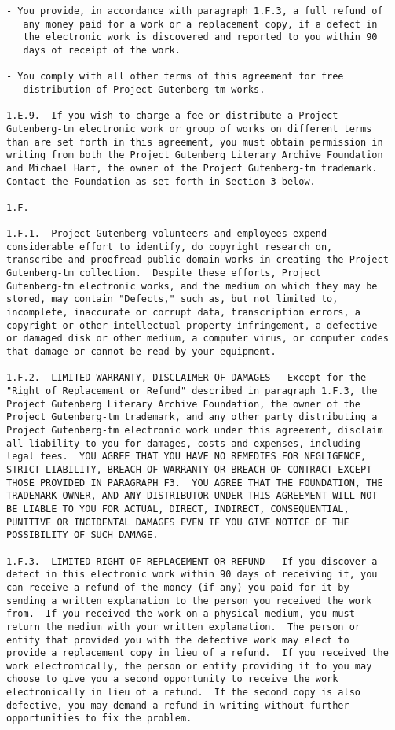 \documentclass[letterpaper,12pt,oneside,openany]{memoir}
\begin{document}
\begin{verbatim}
- You provide, in accordance with paragraph 1.F.3, a full refund of
   any money paid for a work or a replacement copy, if a defect in
   the electronic work is discovered and reported to you within 90
   days of receipt of the work.

- You comply with all other terms of this agreement for free
   distribution of Project Gutenberg-tm works.

1.E.9.  If you wish to charge a fee or distribute a Project
Gutenberg-tm electronic work or group of works on different terms
than are set forth in this agreement, you must obtain permission in
writing from both the Project Gutenberg Literary Archive Foundation
and Michael Hart, the owner of the Project Gutenberg-tm trademark.
Contact the Foundation as set forth in Section 3 below.

1.F.

1.F.1.  Project Gutenberg volunteers and employees expend
considerable effort to identify, do copyright research on,
transcribe and proofread public domain works in creating the Project
Gutenberg-tm collection.  Despite these efforts, Project
Gutenberg-tm electronic works, and the medium on which they may be
stored, may contain "Defects," such as, but not limited to,
incomplete, inaccurate or corrupt data, transcription errors, a
copyright or other intellectual property infringement, a defective
or damaged disk or other medium, a computer virus, or computer codes
that damage or cannot be read by your equipment.

1.F.2.  LIMITED WARRANTY, DISCLAIMER OF DAMAGES - Except for the
"Right of Replacement or Refund" described in paragraph 1.F.3, the
Project Gutenberg Literary Archive Foundation, the owner of the
Project Gutenberg-tm trademark, and any other party distributing a
Project Gutenberg-tm electronic work under this agreement, disclaim
all liability to you for damages, costs and expenses, including
legal fees.  YOU AGREE THAT YOU HAVE NO REMEDIES FOR NEGLIGENCE,
STRICT LIABILITY, BREACH OF WARRANTY OR BREACH OF CONTRACT EXCEPT
THOSE PROVIDED IN PARAGRAPH F3.  YOU AGREE THAT THE FOUNDATION, THE
TRADEMARK OWNER, AND ANY DISTRIBUTOR UNDER THIS AGREEMENT WILL NOT
BE LIABLE TO YOU FOR ACTUAL, DIRECT, INDIRECT, CONSEQUENTIAL,
PUNITIVE OR INCIDENTAL DAMAGES EVEN IF YOU GIVE NOTICE OF THE
POSSIBILITY OF SUCH DAMAGE.

1.F.3.  LIMITED RIGHT OF REPLACEMENT OR REFUND - If you discover a
defect in this electronic work within 90 days of receiving it, you
can receive a refund of the money (if any) you paid for it by
sending a written explanation to the person you received the work
from.  If you received the work on a physical medium, you must
return the medium with your written explanation.  The person or
entity that provided you with the defective work may elect to
provide a replacement copy in lieu of a refund.  If you received the
work electronically, the person or entity providing it to you may
choose to give you a second opportunity to receive the work
electronically in lieu of a refund.  If the second copy is also
defective, you may demand a refund in writing without further
opportunities to fix the problem.


\end{verbatim}
\end{document}
